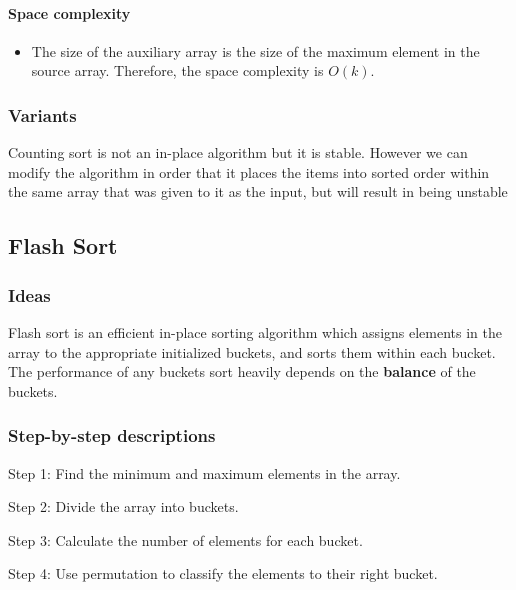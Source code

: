 \documentclass{article}
\newcommand\tab[1][0.5cm]{\hspace*{#1}}
\begin{document}
\paragraph{\tab Space complexity}

\begin{itemize}
    \item The size of the auxiliary array is the size of the maximum element in the source array. Therefore, the space complexity is $O(k)$.
\end{itemize}

\subsubsection{Variants}

\tab Counting sort is not an in-place algorithm but it is stable. However we can modify the algorithm in order that it places the items into sorted order within the same array that was given to it as the input, but will result in being unstable

\pagebreak


\subsection{Flash Sort}

\subsubsection{Ideas}

\tab Flash sort is an efficient in-place sorting algorithm which assigns elements in the array to the appropriate initialized buckets, and sorts them within each bucket. The performance of any buckets sort heavily depends on the \textbf{balance} of the buckets.

\subsubsection{Step-by-step descriptions}

\tab Step 1: Find the minimum and maximum elements in the array.
\smallskip

Step 2: Divide the array into buckets.
\smallskip

Step 3: Calculate the number of elements for each bucket.
\smallskip

Step 4: Use permutation to classify the elements to their right bucket.
\smallskip
\end{document}
